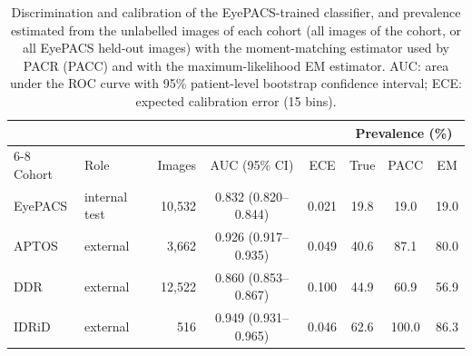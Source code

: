 \begin{table}[!htbp]
\centering
\caption{Discrimination and calibration of the EyePACS-trained classifier, and prevalence estimated from the unlabelled images of each cohort (all images of the cohort, or all EyePACS held-out images) with the moment-matching estimator used by PACR (PACC) and with the maximum-likelihood EM estimator. AUC: area under the ROC curve with 95\% patient-level bootstrap confidence interval; ECE: expected calibration error (15 bins).}
\label{tab:base}
\footnotesize
\begin{tabular}{@{}llrccccc@{}}
\toprule
 & & & & & \multicolumn{3}{c}{Prevalence (\%)} \\
\cmidrule(l){6-8}
Cohort & Role & Images & AUC (95\% CI) & ECE & True & PACC & EM \\
\midrule
EyePACS & internal test & 10,532 & 0.832 (0.820--0.844) & 0.021 & 19.8 & 19.0 & 19.0 \\
APTOS & external & 3,662 & 0.926 (0.917--0.935) & 0.049 & 40.6 & 87.1 & 80.0 \\
DDR & external & 12,522 & 0.860 (0.853--0.867) & 0.100 & 44.9 & 60.9 & 56.9 \\
IDRiD & external & 516 & 0.949 (0.931--0.965) & 0.046 & 62.6 & 100.0 & 86.3 \\
\bottomrule
\end{tabular}
\end{table}
